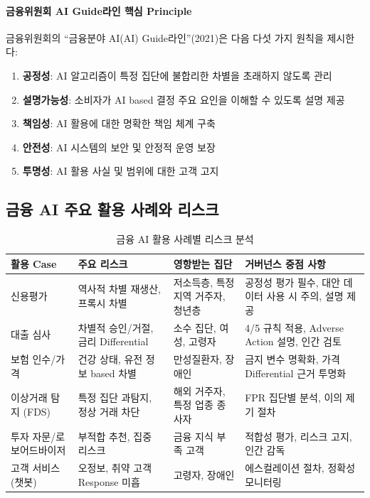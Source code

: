 \paragraph{금융위원회 AI Guide라인 핵심 Principle}

금융위원회의 ``금융분야 AI(AI) Guide라인''(2021)은 
다음 다섯 가지 원칙을 제시한다:

\begin{enumerate}
 \item \textbf{공정성}: AI 알고리즘이 특정 집단에 불합리한 차별을 초래하지 않도록 관리
 \item \textbf{설명가능성}: 소비자가 AI based 결정 주요 요인을 이해할 수 있도록 설명 제공
 \item \textbf{책임성}: AI 활용에 대한 명확한 책임 체계 구축
 \item \textbf{안전성}: AI 시스템의 보안 및 안정적 운영 보장
 \item \textbf{투명성}: AI 활용 사실 및 범위에 대한 고객 고지
\end{enumerate}


\subsection{금융 AI 주요 활용 사례와 리스크}
\label{sec:5.1.2}

\begin{table}[htbp]
\centering
\caption{금융 AI 활용 사례별 리스크 분석}
\label{tab:financial_ai_risks}
\begin{tabularx}{\textwidth}{p{2.5cm}p{3cm}p{3cm}X}
\toprule
\textbf{활용 Case} & \textbf{주요 리스크} & \textbf{영항받는 집단} & \textbf{거버넌스 중점 사항} \\
\midrule
신용평가 & 
역사적 차별 재생산, 프록시 차별 & 
저소득층, 특정 지역 거주자, 청년층 & 
공정성 평가 필수, 대안 데이터 사용 시 주의, 설명 제공 \\
\midrule
대출 심사 & 
차별적 승인/거절, 금리 Differential & 
소수 집단, 여성, 고령자 & 
4/5 규칙 적용, Adverse Action 설명, 인간 검토 \\
\midrule
보험 인수/가격 & 
건강 상태, 유전 정보 based 차별 & 
만성질환자, 장애인 & 
금지 변수 명확화, 가격 Differential 근거 투명화 \\
\midrule
이상거래 탐지 (FDS) & 
특정 집단 과탐지, 정상 거래 차단 & 
해외 거주자, 특정 업종 종사자 & 
FPR 집단별 분석, 이의 제기 절차 \\
\midrule
투자 자문/로보어드바이저 & 
부적합 추천, 집중 리스크 & 
금융 지식 부족 고객 & 
적합성 평가, 리스크 고지, 인간 감독 \\
\midrule
고객 서비스 (챗봇) & 
오정보, 취약 고객 Response 미흡 & 
고령자, 장애인 & 
에스컬레이션 절차, 정확성 모니터링 \\
\bottomrule
\end{tabularx}
\end{table}


